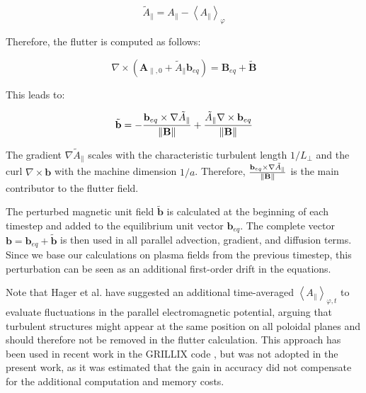 \begin{equation}
	\tilde{A}_\parallel = A_\parallel - \left<A_\parallel\right>_\varphi \label{eq:averagedAParallel}
\end{equation}

Therefore, the flutter is computed as follows: \newline

\begin{equation}
	\nabla \times \left( \mathbf{A}_{\parallel,0} + \tilde{A}_\parallel \mathbf{b}_{eq} \right) = \mathbf{B}_{eq} + \tilde{\mathbf{B}} 
	\label{eq:definitionMagneticFieldWithFlutter}
\end{equation}

This leads to: \newline

\begin{equation}
	\tilde{\mathbf{b}} = - \frac{\mathbf{b}_{eq} \times \nabla \tilde{A}_\parallel}{\norm{\mathbf{B}}} + \frac{\tilde{A}_\parallel \nabla \times \mathbf{b}_{eq}}{\norm{\mathbf{B}}}
	\label{eq:definitionMagneticFieldWithFlutter_1}
\end{equation}

The gradient $\nabla \tilde{A}_\parallel$ scales with the characteristic turbulent length $1/L_\perp$ and the curl $\nabla \times \mathbf{b}$ with the machine dimension $1/a$. Therefore, $\frac{\mathbf{b}_{eq} \times \nabla \tilde{A}_\parallel}{\norm{\mathbf{B}}}$ is the main contributor to the flutter field. \newline

The perturbed magnetic unit field $\tilde{\mathbf{b}}$ is calculated at the beginning of each timestep and added to the equilibrium unit vector $\mathbf{b}_{eq}$. The complete vector $\mathbf{b} = \mathbf{b}_{eq} + \tilde{\mathbf{b}}$ is then used in all parallel advection, gradient, and diffusion terms. Since we base our calculations on plasma fields from the previous timestep, this perturbation can be seen as an additional first-order drift in the equations. \newline

Note that Hager et al. \cite{hager2022} have suggested an additional time-averaged $\left<A_\parallel\right>_{\varphi,t}$ to evaluate fluctuations in the parallel electromagnetic potential, arguing that turbulent structures might appear at the same position on all poloidal planes and should therefore not be removed in the flutter calculation. This approach has been used in recent work in the GRILLIX code \cite{zhang2024}, but was not adopted in the present work, as it was estimated that the gain in accuracy did not compensate for the additional computation and memory costs. \newline





